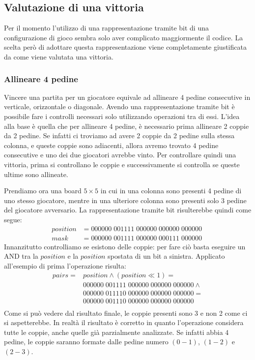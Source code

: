 \documentclass[a4paper]{article}
\begin{document}
\subsection{Valutazione di una vittoria}
Per il momento l'utilizzo di una rappresentazione tramite bit di una 
configurazione di gioco sembra solo aver complicato maggiormente il codice. 
La scelta però di adottare questa rappresentazione viene completamente 
giustificata da come viene valutata una vittoria.

\subsubsection{Allineare 4 pedine}
Vincere una partita per un giocatore equivale ad allineare 4 pedine consecutive
in verticale, orizzontale o diagonale. Avendo una rappresentazione tramite bit è
possibile fare i controlli necessari solo utilizzando operazioni tra di essi.
L'idea alla base è quella che per allineare 4 pedine, è necessario prima 
allineare 2 coppie da 2 pedine. Se infatti ci troviamo ad avere 2 coppie da 2
pedine sulla stessa colonna, e queste coppie sono adiacenti, allora avremo 
trovato 4 pedine consecutive e uno dei due giocatori avrebbe vinto. Per 
controllare quindi una vittoria, prima si controllano le coppie e 
successivamente si controlla se queste ultime sono allineate.

Prendiamo ora una board $5 \times 5$ in cui in una colonna sono presenti 4 pedine
di uno stesso giocatore, mentre in una ulteriore colonna sono presenti solo 3
pedine del giocatore avversario. La rappresentazione tramite bit risulterebbe 
quindi come segue:
\begin{align*}
  position &= 000000\; 001111\; 000000\; 000000\; 000000\\
  mask &= 000000\; 001111\; 000000\; 000111\; 000000\;
\end{align*}
Innanzitutto controlliamo se esistono delle coppie: per fare ciò basta eseguire
un AND tra la $position$ e la $position$ spostata di un bit a sinistra. Applicato
all'esempio di prima l'operazione risulta:
\begin{align*}
  pairs = &position \land (position \ll 1) =\\
  &000000\; 001111\; 000000\; 000000\; 000000 \land \\
  &000000\; 011110\; 000000\; 000000\; 000000 = \\
  &000000\; 001110\; 000000\; 000000\; 000000\\
\end{align*}
Come si può vedere dal risultato finale, le coppie presenti sono 3 e non 2 come
ci si aspetterebbe. In realtà il risultato è corretto in quanto l'operazione
considera tutte le coppie, anche quelle già parzialmente analizzate. Se infatti
abbia 4 pedine, le coppie saranno formate dalle pedine numero $(0-1)$, $(1-2)$ e 
$(2-3)$.
\end{document}

